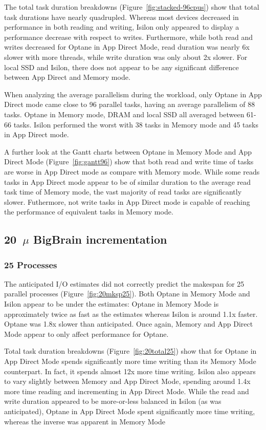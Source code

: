 \documentclass[conference]{IEEEtran}
\newcommand{\bigbrain}{BigBrain\xspace}
\begin{document}
The total task duration breakdowns (Figure~\ref{fig:stacked-96cpus}) show that total task durations
have nearly quadrupled. Whereas most devices decreased in performance in both reading and writing,
Isilon only appeared to display a performance decrease with respect to writes. Furthermore, while both
read and writes decreased for Optane in App Direct Mode, read duration was nearly 6x slower with more threads,
while write duration was only about 2x slower. For local SSD and Isilon, there does not appear to 
be any significant difference between App Direct and Memory mode.

When analyzing the average parallelism during the workload, only Optane in App Direct mode
came close to 96 parallel tasks, having an average parallelism of 88 tasks. Optane in Memory mode,
DRAM and local SSD all averaged between 61-66 tasks. Isilon performed the worst with 38 tasks in Memory 
mode and 45 tasks in App Direct mode.

A further look at the Gantt charts between Optane in Memory Mode and App Direct Mode (Figure~\ref{fig:gantt96})
show that both read and write time of tasks are worse in App Direct mode as compare with Memory mode.
While some reads tasks in App Direct mode appear to be of similar duration to the average read task time
of Memory mode, the vast majority of read tasks are significantly slower. Futhermore, not write tasks in App
Direct mode is capable of reaching the performance of equivalent tasks in Memory mode.

\subsection{20~$\mu$ \bigbrain incrementation}
\subsubsection{25 Processes}

The anticipated I/O estimates did not correctly predict the makespan for 25 parallel
processes (Figure~\ref{fig:20mksp25}). Both Optane in Memory Mode and Isilon appear 
to be under the estimates: Optane in Memory Mode is approximately twice as fast as the
estimates whereas Isilon is around 1.1x faster. Optane was 1.8x slower than anticipated.
Once again, Memory and App Direct Mode appear to only affect performance for Optane.

Total task duration breakdowns (Figure~\ref{fig:20total25}) show that for Optane in
App Direct Mode spends significantly more time writing than its Memory Mode counterpart.
In fact, it spends almost 12x more time writing. Isilon also appears to vary slightly
between Memory and App Direct Mode, spending around 1.4x more time reading and incrementing
in App Direct Mode. While the read and write duration appeared to be more-or-less balanced in
Isilon (as was anticipated), Optane in App Direct Mode spent significantly more time writing, whereas the 
inverse was apparent in Memory Mode
\end{document}
